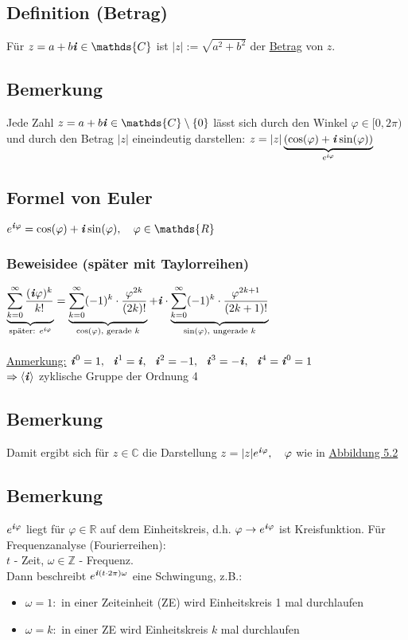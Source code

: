\documentclass[a4paper, 12pt,titlepage, pdf, headsepline]{article}
\newcommand{\R}{\mathds{R}}
\newcommand{\Z}{\mathds{Z}}
\newcommand{\C}{\mathds{C}}
\newcommand{\uline}[1]{\underline{#1}}
\renewcommand{\i}{\textbf{\textit{i}}}
\renewcommand{\>}{\rightarrow}
\renewcommand{\*}{\cdot}
\renewcommand{\phi}{\varphi}
\begin{document}
		      		\subsection{Definition (Betrag)}
		      		Für $z = a+b\i \in \C$ ist $|z| := \sqrt{a^2 + b^2}$ der \uline{Betrag} von $z$.
		      		\subsection{Bemerkung}
		      		Jede Zahl $z = a+b\i \in \C \setminus \{0\} $ lässt sich durch den Winkel $\phi \in [0,2\pi)$ und durch den Betrag $|z|$ eineindeutig darstellen: 
		      			$z = |z|\underbrace{(\cos(\phi) + \i \sin(\phi))}_{e^{\i\phi}}$
		      			\subsection{Formel von Euler}
		      			\label{5.5}
		      			$e^{\i\phi} = \cos(\phi) + \i \sin(\phi),~~~ \phi \in \R$
		      			\subsubsection*{Beweisidee (später mit Taylorreihen)}
		      			$\underbrace{\sum_{k = 0}^{\infty} \frac{(\i\phi)^k}{k!}}_{\text{später: }e^{\i\phi}} = \underbrace{\sum_{k = 0}^{\infty}(-1)^k \cdot \frac{\phi^{2k}}{(2k)!}}_{\cos(\phi)\textrm{, gerade }k} + \i \cdot \underbrace{ \sum_{k = 0}^{\infty}(-1)^k \cdot \frac{\phi^{2k+1}}{(2k+1)!}}_{\sin(\phi)\textrm{, ungerade }k}$\\
		      			\\
		      			\uline{Anmerkung:} $\i^0 = 1,~~ \i^1 = \i,~~ \i^2 = -1,~~ \i^3 = -\i,~~ \i^4 = \i^0 = 1$\\
		      			$\Rightarrow \langle \i \rangle$ zyklische Gruppe der Ordnung 4
		      			\subsection{Bemerkung}
		      			Damit ergibt sich für $z \in \C$ die Darstellung $z = |z| e^{\i\phi},~~~ \phi$ wie in \hyperref[5.2]{Abbildung 5.2}
		      			\subsection{Bemerkung}
		      			$e^{\i\phi}$ liegt für $\phi \in \R$ auf dem Einheitskreis, d.h. $\phi \rightarrow e^{\i\phi}$ ist Kreisfunktion. Für Frequenzanalyse (Fourierreihen): \\
		      			$t$ - Zeit, $\omega \in \Z$ - Frequenz. \\
		      			Dann beschreibt $e^{\i(t \cdot 2\pi) \omega}$ eine Schwingung, z.B.:
		      			\begin{itemize}
		      				\item $\omega = 1:$ in einer Zeiteinheit (ZE) wird Einheitskreis 1 mal durchlaufen
		      				\item $\omega = k:$ in einer ZE wird Einheitskreis $k$ mal durchlaufen
		      			\end{itemize}
\end{document}
